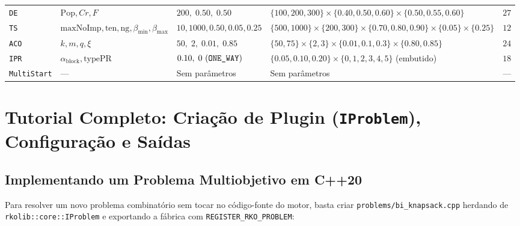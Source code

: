 \documentclass[11pt,a4paper]{article}
\begin{document}
\begin{small}
\begin{longtable}{@{}llp{4.3cm}p{5.5cm}r@{}}
\texttt{DE} & $\text{Pop}, Cr, F$ & $200,\; 0.50,\; 0.50$ & $\{100,200,300\}\times\{0.40,0.50,0.60\}\times\{0.50,0.55,0.60\}$ & $27$ \\
\texttt{TS} & $\text{maxNoImp}, \text{ten}, \text{ng}, \beta_{\min}, \beta_{\max}$ & $10, 1000, 0.50, 0.05, 0.25$ & $\{500,1000\}\times\{200,300\}\times\{0.70,0.80,0.90\}\times\{0.05\}\times\{0.25\}$ & $12$ \\
\texttt{ACO} & $k, m, q, \xi$ & $50,\; 2,\; 0.01,\; 0.85$ & $\{50,75\}\times\{2,3\}\times\{0.01,0.1,0.3\}\times\{0.80,0.85\}$ & $24$ \\
\texttt{IPR} & $\alpha_{\text{block}}, \text{typePR}$ & $0.10,\; 0\text{ (\texttt{ONE\_WAY})}$ & $\{0.05,0.10,0.20\}\times\{0,1,2,3,4,5\}$ (embutido) & $18$ \\
\texttt{MultiStart} & --- & Sem parâmetros & Sem parâmetros & --- \\
\end{longtable}
\end{small}

\section{Tutorial Completo: Criação de Plugin (\texttt{IProblem}), Configuração e Saídas}
\label{sec:tutorial}

\subsection{Implementando um Problema Multiobjetivo em C++20}

Para resolver um novo problema combinatório sem tocar no código-fonte do motor, basta criar \texttt{problems/bi\_knapsack.cpp} herdando de \texttt{rkolib::core::IProblem} e exportando a fábrica com \texttt{REGISTER\_RKO\_PROBLEM}:
\end{document}
